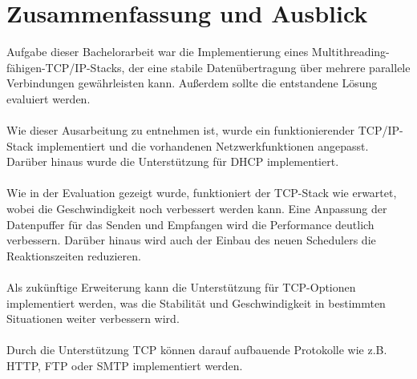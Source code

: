 \chapter{Zusammenfassung und Ausblick}

Aufgabe dieser Bachelorarbeit war die Implementierung eines Multithreading-fähigen-TCP/IP-Stacks, der eine stabile Datenübertragung über mehrere parallele Verbindungen gewährleisten kann. Außerdem sollte die entstandene Lösung evaluiert werden. \\\\
Wie dieser Ausarbeitung zu entnehmen ist, wurde ein funktionierender TCP/IP-Stack implementiert und die vorhandenen Netzwerkfunktionen angepasst. Darüber hinaus wurde die Unterstützung für DHCP implementiert. \\\\
Wie in der Evaluation gezeigt wurde, funktioniert der TCP-Stack wie erwartet, wobei die Geschwindigkeit noch verbessert werden kann. Eine Anpassung der Datenpuffer für das Senden und Empfangen wird die Performance deutlich verbessern. Darüber hinaus wird auch der Einbau des neuen Schedulers die Reaktionszeiten reduzieren. \\\\
Als zukünftige Erweiterung kann die Unterstützung für TCP-Optionen implementiert werden, was die Stabilität und Geschwindigkeit in bestimmten Situationen weiter verbessern wird.\\\\
Durch die Unterstützung TCP können darauf aufbauende Protokolle wie z.B. HTTP, FTP oder SMTP implementiert werden. 


